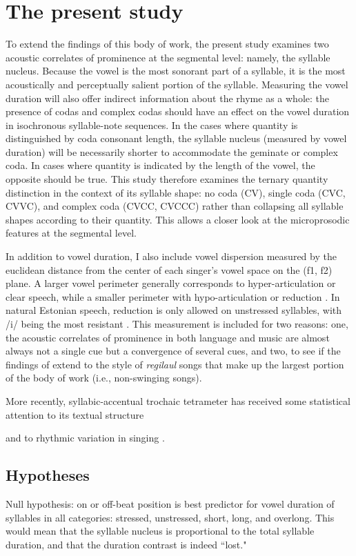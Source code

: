 \section{The present study}

To extend the findings of this body of work, the present study examines two acoustic correlates of prominence at the segmental level: namely, the syllable nucleus. Because the vowel is the most sonorant part of a syllable, it is the most acoustically and perceptually salient portion of the syllable. Measuring the vowel duration will also offer indirect information about the rhyme as a whole: the presence of codas and complex codas should have an effect on the vowel duration in isochronous syllable-note sequences. In the cases where quantity is distinguished by coda consonant length, the syllable nucleus (measured by vowel duration) will be necessarily shorter to accommodate the geminate or complex coda. In cases where quantity is indicated by the length of the vowel, the opposite should be true. This study therefore examines the ternary quantity distinction in the context of its syllable shape: no coda (CV), single coda (CVC, CVVC), and complex coda (CVCC, CVCCC) rather than collapsing all syllable shapes according to their quantity. This allows a closer look at the microprosodic features at the segmental level. 

In addition to vowel duration, I also include vowel dispersion measured by the euclidean distance from the center of each singer's vowel space on the (f1, f2) plane. A larger vowel perimeter generally corresponds to hyper-articulation or clear speech, while a smaller perimeter with hypo-articulation or reduction \cite{lindblom1990, smiljanic2005}. In natural Estonian speech, reduction is only allowed on unstressed syllables, with /i/ being the most resistant \citep{eekMeister1998}. This measurement is included for two reasons: one, the acoustic correlates of prominence in both language and music are almost always not a single cue but a convergence of several cues, and two, to see if the findings of \citep{ross1992} extend to the style of {\it regilaul} songs that make up the largest portion of the body of work (i.e., non-swinging songs). 


More recently, syllabic-accentual trochaic tetrameter has received some statistical attention to its textual structure \citep{lotmanLotman2013} 

and to rhythmic variation in singing \citep{oras2019}. 
\subsection{Hypotheses}
Null hypothesis: on or off-beat position is best predictor for vowel duration of syllables in all categories: stressed, unstressed, short, long, and overlong. This would mean that the syllable nucleus is proportional to the total syllable duration, and that the duration contrast is indeed ``lost." 

